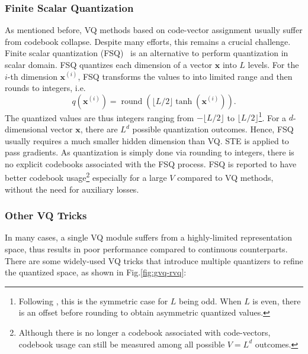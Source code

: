 \subsubsection{Finite Scalar Quantization}
As mentioned before, VQ methods based on code-vector assignment usually suffer from codebook collapse. 
Despite many efforts, this remains a crucial challenge.
Finite scalar quantization (FSQ)~\cite{mentzer2024finite} is an alternative to perform quantization in scalar domain.
FSQ quantizes each dimension of a vector $\bm x$ into $L$ levels.
For the $i$-th dimension $\bm x^{(i)}$, FSQ transforms the values to into limited range and then rounds to integers, i.e. 
\begin{equation}
    q\left(\bm x^{(i)}\right)=\operatorname{round}\left(\lfloor L/2\rfloor\tanh\left(\bm x^{(i)}\right)\right).
\end{equation}
The quantized values are thus integers ranging from $-\lfloor L/2 \rfloor$ to $\lfloor L/2 \rfloor$\footnote{Following \cite{mentzer2024finite}, this is the symmetric case for $L$ being odd. When $L$ is even, there is an offset before rounding to obtain asymmetric quantized values.}.
For a $d$-dimensional vector $\bm x$, there are $L^d$ possible quantization outcomes.
Hence, FSQ usually requires a much smaller hidden dimension than VQ.
STE is applied to pass gradients.
As quantization is simply done via rounding to integers, there is no explicit codebooks associated with the FSQ process.
FSQ is reported to have  better codebook usage\footnote{Although there is no longer a codebook associated with code-vectors, codebook usage can still be measured among all possible $V=L^d$ outcomes.} especially for a large $V$ compared to VQ methods, without the need for auxiliary losses.

\subsubsection{Other VQ Tricks}
In many cases, a single VQ module suffers from a highly-limited representation space, thus results in poor performance compared to continuous counterparts. 
There are some widely-used VQ tricks that introduce multiple quantizers to refine the quantized space, as shown in Fig.\ref{fig:gvq-rvq}:

